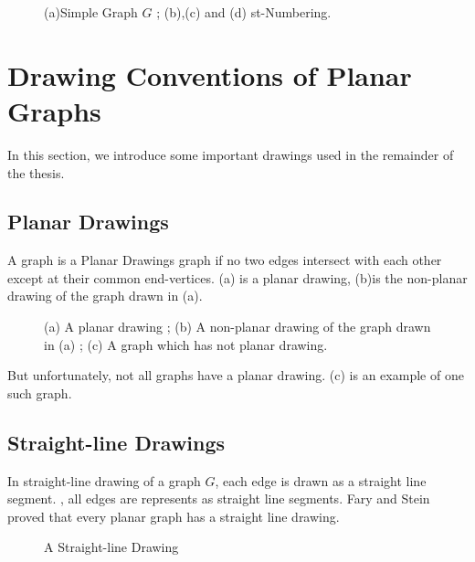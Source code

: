 \begin{figure}[!tb]
  \centering
\resizebox{100mm}{!}{}
\caption{(a)Simple Graph $G$ ; (b),(c) and (d) st-Numbering.}
\label{fig:st}
\end{figure}



\section{Drawing Conventions of Planar Graphs}
\label{dcpg}

In this section, we introduce some important drawings used in the remainder of the thesis.

\subsection{Planar Drawings}

A graph is a Planar Drawings graph if no two edges intersect with each other except at their common end-vertices.  (a) is a planar drawing, (b)is the non-planar drawing of the graph drawn in (a).

\begin{figure}[!tb]
\centering
\resizebox{150mm}{!}{}
\caption{(a) A planar drawing ; (b) A non-planar drawing of the graph drawn in (a) ; (c) A graph which has not planar drawing.}
\label{fig:planar_drawings}
\end{figure}

But unfortunately, not all graphs have a planar drawing.  (c) is an example of one such graph.


\subsection{Straight-line Drawings}

In straight-line drawing of a graph $G$, each edge is drawn as a straight line segment. , all edges are represents as straight line segments. Fary \cite{fary} and Stein \cite{stein} proved that every planar graph has a straight line drawing.

\begin{figure}[!tb]
\centering
\resizebox{20mm}{!}{}
\caption{A Straight-line Drawing}
\label{fig:straight_line_drawing}
\end{figure}





